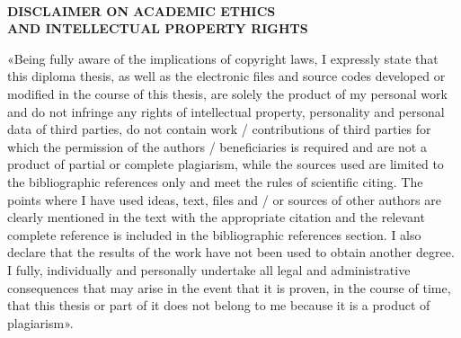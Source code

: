 \thispagestyle{plain}
~\vspace{2cm}
\begin{center}\large\bf
DISCLAIMER ON ACADEMIC ETHICS\\
AND INTELLECTUAL PROPERTY RIGHTS
\end{center}
\vspace{2cm}
«Being fully aware of the implications of copyright laws, I expressly state that this diploma thesis, as well as the electronic files and source codes developed or modified in the course of this thesis, are solely the product of my personal work and do not infringe any rights of intellectual property, personality and personal data of third parties, do not contain work / contributions of third parties for which the permission of the authors / beneficiaries is required and are not a product of partial or complete plagiarism, while the sources used are limited to the bibliographic references only and meet the rules of scientific citing. The points where I have used ideas, text, files and / or sources of other authors are clearly mentioned in the text with the appropriate citation and the relevant complete reference is included in the bibliographic references section. I also declare that the results of the work have not been used to obtain another degree. I fully, individually and personally undertake all legal and administrative consequences that may arise in the event that it is proven, in the course of time, that this thesis or part of it does not belong to me because it is a product of plagiarism».
\vspace{1cm}

\noindent{}
\vspace{1.7cm}


\noindent\authornameEng 
{}
